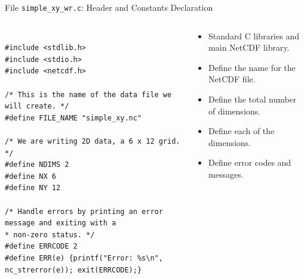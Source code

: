 \documentclass[compress,11pt,xcolor=svgnames,aspectratio=169]{beamer}
\begin{document}
\begin{frame}[fragile]{File \texttt{simple\_xy\_wr.c}: Header and Constants Declaration}

\begin{columns}

\begin{column}{0.5\textwidth}

{\tiny

\begin{verbatim}

#include <stdlib.h>
#include <stdio.h>
#include <netcdf.h>

/* This is the name of the data file we will create. */
#define FILE_NAME "simple_xy.nc"

/* We are writing 2D data, a 6 x 12 grid. */
#define NDIMS 2
#define NX 6
#define NY 12

/* Handle errors by printing an error message and exiting with a
* non-zero status. */
#define ERRCODE 2
#define ERR(e) {printf("Error: %s\n", nc_strerror(e)); exit(ERRCODE);}

\end{verbatim}

}

\end{column}

\begin{column}{0.5\textwidth}


{\footnotesize

\begin{itemize}

\item Standard C libraries and main NetCDF library.\\[0.6cm]

\item Define the name for the NetCDF file.\\[0.4cm]

\item Define the total number of dimensions.
\item Define each of the dimensions.\\[0.6cm]

\item Define error codes and messages.

\end{itemize}

}

\end{column}

\end{columns}

\end{frame}
\end{document}
